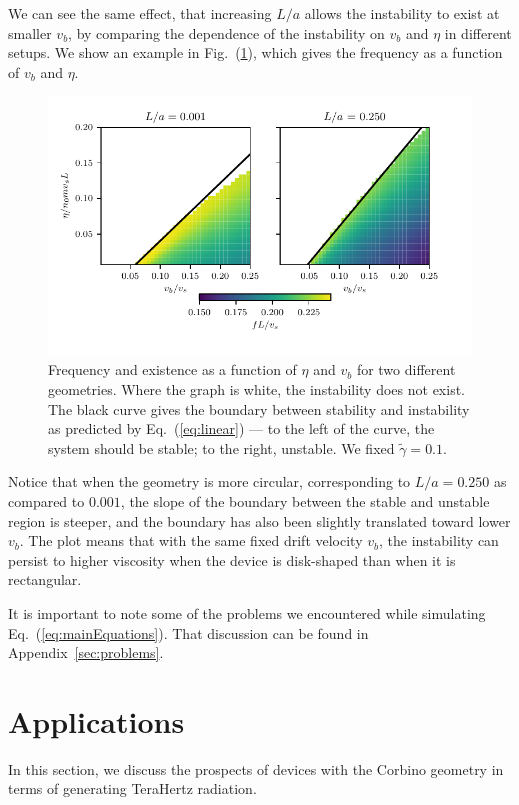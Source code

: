 \documentclass[12pt]{article}
\begin{document}
We can see the same effect, that increasing $L/a$ allows the instability to exist at smaller $v_b$, by comparing the dependence of the instability on $v_b$ and $\eta$ in different setups.  We show an example in Fig.~(\ref{fig:v0_eta}), which gives the frequency as a function of $v_b$ and $\eta$. 
\begin{figure}[ht]
	\centering
	\includegraphics{Figures/v0_eta_freq.pdf}
	\caption{Frequency and existence as a function of $\eta$ and $v_b$ for two different geometries.  Where the graph is white, the instability does not exist.  The black curve gives the boundary between stability and instability as predicted by Eq.~(\ref{eq:linear}) --- to the left of the curve, the system should be stable; to the right, unstable.  We fixed $\tilde{\gamma} = 0.1$.}\label{fig:v0_eta}
\end{figure}
Notice that when the geometry is more circular, corresponding to $L/a = 0.250$ as compared to $0.001$, the slope of the boundary between the stable and unstable region is steeper, and the boundary has also been slightly translated toward lower $v_b$.  The plot means that with the same fixed drift velocity $v_b$, the instability can persist to higher viscosity when the device is disk-shaped than when it is rectangular. 



It is important to note some of the problems we encountered while simulating Eq.~(\ref{eq:mainEquations}).  That discussion can be found in Appendix~\ref{sec:problems}.


\section{Applications}
In this section, we discuss the prospects of devices with the Corbino geometry in terms of generating TeraHertz radiation. 
\end{document}

